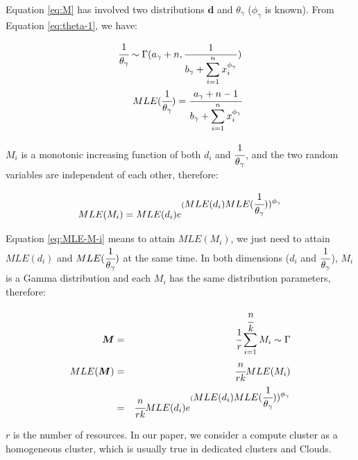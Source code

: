 \documentclass{IOS-Book-Article}
\begin{document}
Equation \ref{eq:M} has involved two distributions $\bm d$ and $\theta_{\gamma}$ ($\phi_{\gamma}$ is known). From Equation \ref{eq:theta-1}, we have:

\begin{eqnarray}
\displaystyle\cfrac{1}{\theta_{\gamma}}\sim\Gamma(a_{\gamma}+n,\frac{1}{\displaystyle b_{\gamma}+\sum_{i=1}^n{x_i^{\phi_{\gamma}}}}) \\
MLE(\displaystyle\cfrac{1}{\theta_{\gamma}})=\displaystyle\cfrac{a_{\gamma}+n-1}{\displaystyle b_{\gamma}+\sum_{i=1}^n{x_i^{\phi_{\gamma}}}}
\label{eq:theta}
 \end{eqnarray}

$M_i$ is a monotonic increasing function of both $d_i$ and $\displaystyle\cfrac{1}{\theta_{\gamma}}$, and the two random variables are independent of each other, therefore:


\begin{equation} 
\label{eq:MLE-M-i}
MLE(M_i)=MLE(d_i)e^{(\displaystyle MLE(d_i)MLE(\cfrac{1}{\theta_{\gamma}}))^{\phi_{\gamma}}} 
\end{equation}

Equation \ref{eq:MLE-M-i} means to attain $MLE(M_i)$, we just need to attain $MLE(d_i)$ and $MLE(\cfrac{1}{\theta_{\gamma}})$ at the same time. 
In both dimensions ($d_i$ and $\displaystyle\cfrac{1}{\theta_{\gamma}}$), $M_i$ is a Gamma distribution and each $M_i$ has the same distribution parameters, therefore:

\begin{eqnarray} 
\label{eq:MLE-M}
\bm{M}&=&\displaystyle\cfrac{1}{r}\sum_{i=1}^{\cfrac{n}{k}}M_i\sim\Gamma \nonumber\\
MLE(\bm{M})&=&\displaystyle\cfrac{n}{rk}MLE(M_i)\\
&=&\displaystyle\cfrac{n}{rk} MLE(d_i)e^{(\displaystyle MLE(d_i)MLE(\cfrac{1}{\theta_{\gamma}}))^{\phi_{\gamma}}} 
\end{eqnarray}

$r$ is the number of resources. In our paper, we consider a compute cluster as a homogeneous cluster, which is usually true in dedicated clusters and Clouds. 

\end{document}
